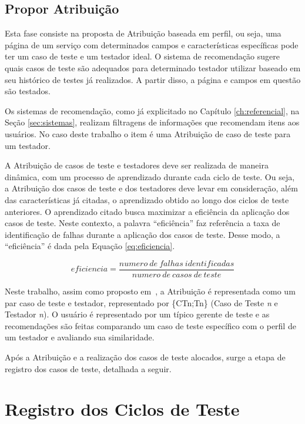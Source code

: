 \subsection{Propor Atribuição}

 Esta fase consiste na proposta de Atribuição baseada em perfil, ou seja, uma página de um serviço com determinados campos e características específicas pode ter um caso de teste e um testador ideal. O sistema de recomendação sugere quais casos de teste são adequados para determinado testador utilizar baseado em seu histórico de testes já realizados. A partir disso, a página e campos em questão são testados.

 Os sistemas de recomendação, como já explicitado no Capítulo \ref{ch:referencial}, na Seção \ref{sec:sistemas}, realizam filtragens de informações que recomendam itens aos usuários. No caso deste trabalho o item é uma Atribuição de caso de teste para um testador.

 A Atribuição de casos de teste e testadores deve ser realizada de maneira dinâmica, com um processo de aprendizado durante cada ciclo de teste. Ou seja, a Atribuição dos casos de teste e dos testadores deve levar em consideração, além das características já citadas, o aprendizado obtido ao longo dos ciclos de teste anteriores. O aprendizado citado busca maximizar a eficiência da aplicação dos casos de teste. Neste contexto, a palavra ``eficiência'' faz referência a taxa de identificação de falhas durante a aplicação dos casos de teste. Desse modo, a ``eficiência'' é dada pela Equação \ref{eq:eficiencia}.

 \begin{equation}
 \label{eq:eficiencia}
    eficiencia = \frac{numero \ de \ falhas\ identificadas}{numero\ de\ casos\ de\ teste}
 \end{equation}


Neste trabalho, assim como proposto em~\cite{miranda2012recommender}, a Atribuição é representada como um par caso de teste e testador, representado por \{CTn;Tn\} (Caso de Teste \emph{n} e Testador \emph{n}). O usuário é representado por um típico gerente de teste e as recomendações são feitas comparando um caso de teste específico com o perfil de um testador e avaliando sua similaridade.

 Após a Atribuição e a realização dos casos de teste alocados, surge a etapa de registro dos casos de teste, detalhada a seguir.

\section{Registro dos Ciclos de Teste}

